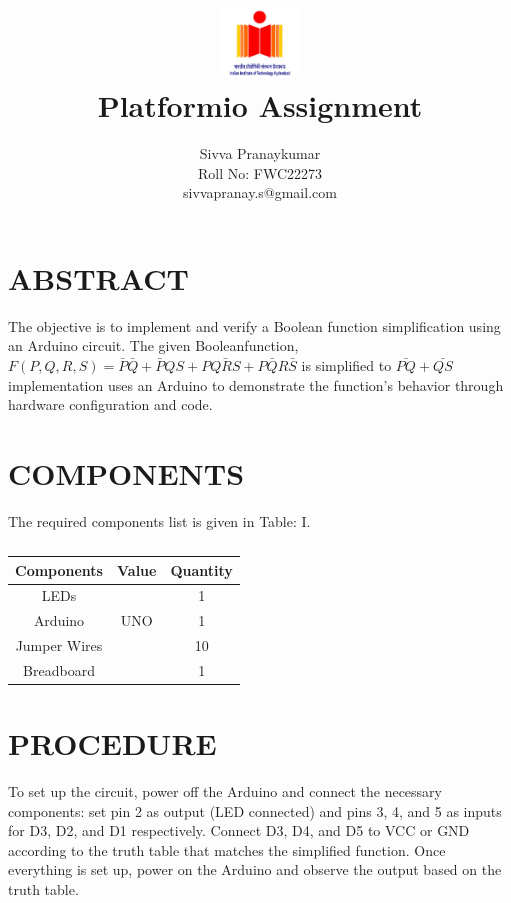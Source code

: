 \documentclass[conference]{IEEEtran}
\title{
\vspace{1cm}
{\includegraphics[width=0.15\textwidth]{  IMG-20241021-WA0004 } \\ Platformio Assignment} }
\author{Sivva Pranaykumar\\ Roll No: FWC22273\\ sivvapranay.s@gmail.com}
\begin{document}
\maketitle
 \section {ABSTRACT}
 The objective is to implement and verify a Boolean function simplification using an Arduino circuit. The given Booleanfunction,$F(P,Q,R,S)=\bar{P}\bar{Q}+\bar{P}QS+P\bar{QRS}+P\bar{Q}R\bar{S}$ is simplified to $\bar{PQ}+\bar{QS}$
 implementation uses an Arduino to demonstrate the function’s behavior through hardware configuration and code.
\section{COMPONENTS}
The required components list is given in Table: I. 

 \begin{table} [htbp]
\centering
\begin{tabular}{| c | c | c |} \hline
Components & Value & Quantity \\\hline
LEDs &  & 1 \\ \hline
Arduino & UNO & 1 \\ \hline
Jumper Wires &  & 10 \\ \hline
Breadboard & & 1 \\ 
\hline
\end{tabular}
\vspace{0.1cm}
\caption{\label{tab:widgets}}
\end{table}
\section{PROCEDURE}
To set up the circuit, power off the Arduino and connect the necessary components: set pin 2 as output (LED connected) and pins 3, 4, and 5 as inputs for D3, D2, and D1 respectively. Connect D3, D4, and D5 to VCC or GND according to the truth table that matches the simplified function. Once everything is set up, power on the Arduino and observe the output based on the truth table.
\end{document}
